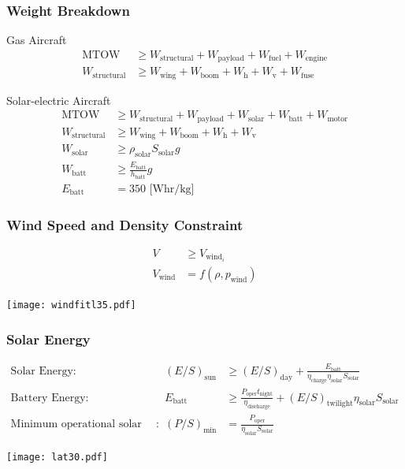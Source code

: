 \documentclass{beamer}
\begin{document}
\begin{frame}
    \frametitle{Weight Breakdown}

    \pause
    Gas Aircraft
    \begin{align*}
        \text{MTOW} &\geq W_{\text{structural}}  + W_{\text{payload}} + W_{\text{fuel}} + W_{\text{engine}} \\
        W_{\text{structural}} &\geq W_{\text{wing}} + W_{\text{boom}} + W_{\text{h}}+ W_{\text{v}} + W_{\text{fuse}}
    \end{align*}

    \pause
    Solar-electric Aircraft
    \begin{align*}
        \text{MTOW} &\geq W_{\text{structural}} + W_{\text{payload}} + W_{\text{solar}} + W_{\text{batt}} + W_{\text{motor}} \\
        W_{\text{structural}} &\geq W_{\text{wing}} + W_{\text{boom}} + W_{\text{h}}+ W_{\text{v}} \\
        W_{\text{solar}} &\geq \rho_{\text{solar}} S_{\text{solar}} g \\
        W_{\text{batt}} &\geq \frac{E_{\text{batt}}}{h_{\text{batt}}} g \\
        E_{\text{batt}} &= 350 \text{ [Whr/kg]}
    \end{align*}

\end{frame}

\begin{frame}
    \frametitle{Wind Speed and Density Constraint}

    \begin{align*}
        V &\geq V_{\text{wind}_i} \\
        V_{\text{wind}} &= f(\rho, p_{\text{wind}})
    \end{align*}

    \begin{center}
    \texttt{[image: windfitl35.pdf]}
    \end{center}

\end{frame}

\begin{frame}
    \frametitle{Solar Energy}

    \scriptsize
    \[ \begin{array}{rrl}
        \text{Solar Energy} : & (E/S)_{\text{sun}}  &\geq (E/S)_{\text{day}} + \frac{E_{\text{batt}}}{\eta_{\text{charge}}\eta_{\text{solar}} S_{\text{solar}}} \\
        \text{Battery Energy} : &E_{\text{batt}} &\geq \frac{P_{\text{oper}}t_{\text{night}}}{\eta_{\text{discharge}}} + (E/S)_{\text{twilight}} \eta_{\text{solar}} S_{\text{solar}} \\
        \text{Minimum operational solar power} : & (P/S)_{\text{min}} &= \frac{P_{\text{oper}}}{\eta_{\text{solar}} S_{\text{solar}}} 
    \end{array} \]

    \begin{center}
    \texttt{[image: lat30.pdf]}
    \end{center}
\end{frame}
\end{document}
